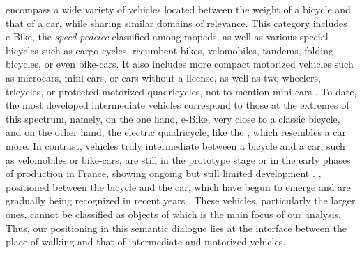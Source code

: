 \begin{refsegment}
{     encompass a wide variety of vehicles located between the weight of a bicycle and that of a car, while sharing similar domains of relevance. This category includes \acrshort{e-Bike}, the \textsl{speed pedelec} classified among mopeds, as well as various special bicycles such as cargo cycles, recumbent bikes, velomobiles, tandems, folding bicycles, or even bike-cars. It also includes more compact motorized vehicles such as microcars, mini-cars, or cars without a license, as well as two-wheelers, tricycles, or protected motorized quadricycles, not to mention mini-cars \textcolor{blue}{\autocites{bigo_malus_2020}{heran_avenir_2022}[2]{bigo_quelle_2024}}.
To date, the most developed intermediate vehicles correspond to those at the extremes of this spectrum, namely, on the one hand, \acrshort{e-Bike}, very close to a classic bicycle, and on the other hand, the electric quadricycle, like the , which resembles a car more. In contrast, vehicles truly intermediate between a bicycle and a car, such as velomobiles or bike-cars, are still in the prototype stage or in the early phases of production in France, showing ongoing but still limited development \textcolor{blue}{\autocite{bigo_vehicules_2023}}.
}, positioned between the bicycle and the car, which have begun to emerge and are gradually being recognized in recent years \textcolor{blue}{\autocites{bigo_malus_2020}{heran_avenir_2022}[12]{bigo_quelle_2024}}. These vehicles, particularly the larger ones, cannot be classified as objects of  which is the main focus of our analysis. Thus, our positioning in this semantic dialogue lies at the interface between the place of walking and that of intermediate and motorized vehicles.%


\end{refsegment}
